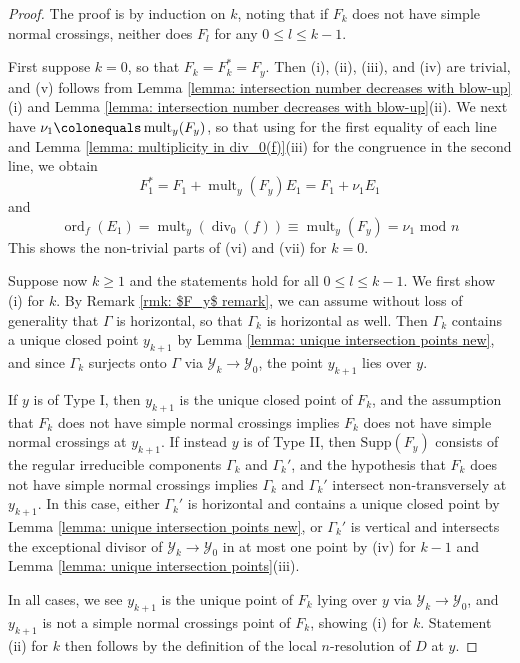\documentclass[12pt]{amsart}
\numberwithin{equation}{section}
\theoremstyle{definition}
\newcommand{\Y}{\mathcal{Y}}
\newcommand{\tx}[1]{\text{#1}}
\DeclareMathOperator{\divi}{div}
\DeclareMathOperator{\mult}{mult}
\DeclareMathOperator{\ord}{ord}
\begin{document}
\begin{proof}
    The proof is by induction on $k$, noting that if $F_k$ does not have simple normal crossings, neither does $F_l$ for any $0\leq l\leq k-1$.
    
    First suppose $k=0$, so that $F_k=F_k^*=F_y$. Then (i), (ii), (iii), and (iv) are trivial, and (v) follows from Lemma \ref{lemma: intersection number decreases with blow-up}(i) and Lemma \ref{lemma: intersection number decreases with blow-up}(ii). We next have $\nu_1\colonequals\mult_y(F_y)$, so that using \cite[Proposition 9.2.23]{Liu_book} for the first equality of each line and Lemma \ref{lemma: multiplicity in div_0(f)}(iii) for the congruence in the second line, we obtain \[F^*_1=F_1+\mult_y(F_y)E_1=F_1+\nu_1E_1\] and \[\ord_f(E_1)=\mult_y(\divi_0(f))\equiv \mult_y(F_y)=\nu_1\tx{ mod }n\]
    This shows the non-trivial parts of (vi) and (vii) for $k=0$.
    
    Suppose now $k\geq 1$ and the statements hold for all $0\leq l\leq k-1$. We first show (i) for $k$. By Remark \ref{rmk: $F_y$ remark}, we can assume without loss of generality that $\Gamma$ is horizontal, so that $\Gamma_k$ is horizontal as well. Then $\Gamma_k$ contains a unique closed point $y_{k+1}$ by Lemma \ref{lemma: unique intersection points new}, and since $\Gamma_k$ surjects onto $\Gamma$ via $\Y_k\to\Y_0$, the point $y_{k+1}$ lies over $y$.
    
    If $y$ is of Type I, then $y_{k+1}$ is the unique closed point of $F_k$, and the assumption that $F_k$ does not have simple normal crossings implies $F_k$ does not have simple normal crossings at $y_{k+1}$. If instead $y$ is of Type II, then $\tx{Supp}(F_y)$ consists of the regular irreducible components $\Gamma_k$ and $\Gamma_k'$, and the hypothesis that $F_k$ does not have simple normal crossings implies $\Gamma_k$ and $\Gamma_k'$ intersect non-transversely at $y_{k+1}$. In this case, either $\Gamma_k'$ is horizontal and contains a unique closed point by Lemma \ref{lemma: unique intersection points new}, or $\Gamma_k'$ is vertical and intersects the exceptional divisor of $\Y_k\to\Y_0$ in at most one point by (iv) for $k-1$ and Lemma \ref{lemma: unique intersection points}(iii).
    
    In all cases, we see $y_{k+1}$ is the unique point of $F_k$ lying over $y$ via $\Y_k\to\Y_0$, and $y_{k+1}$ is not a simple normal crossings point of $F_k$, showing (i) for $k$. Statement (ii) for $k$ then follows by the definition of the local $n$-resolution of $D$ at $y$.
    

\end{proof}
\end{document}
